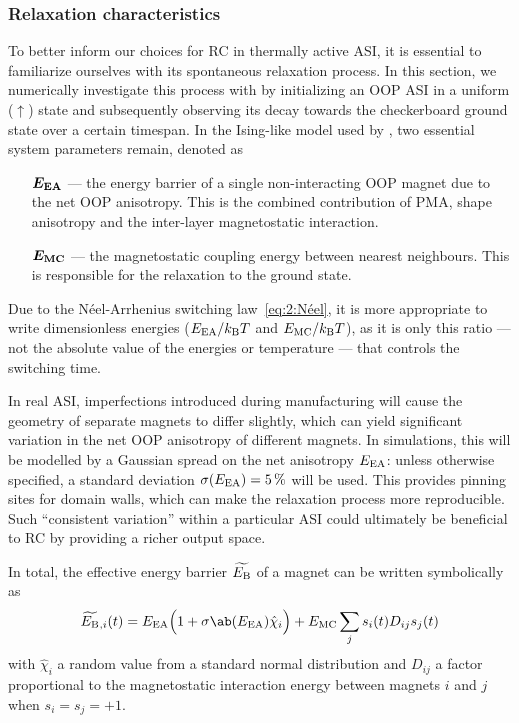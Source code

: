 \subsubsection{Relaxation characteristics}
To better inform our choices for RC in thermally active ASI, it is essential to familiarize ourselves with its spontaneous relaxation process.
In this section, we numerically investigate this process with \hotspice by initializing an OOP ASI in a uniform ($\uparrow$) state and subsequently observing its decay towards the checkerboard ground state over a certain timespan.
In the Ising-like model used by \hotspice, two essential system parameters remain, denoted as
\begin{itemize}[leftmargin=4.1em]
	\item[$\boldsymbol{E_\mathrm{EA}}$ ---] the energy barrier of a single non-interacting OOP magnet due to the net OOP anisotropy.
	This is the combined contribution of PMA, shape anisotropy and the inter-layer magnetostatic interaction.
	\item[$\boldsymbol{E_\mathrm{MC}}$ ---] the magnetostatic coupling energy between nearest neighbours.
	This is responsible for the relaxation to the ground state.
\end{itemize}
Due to the N\'eel-Arrhenius switching law~\eqref{eq:2:Néel}, it is more appropriate to write dimensionless energies ($\EEA/\kBT$ and $\EMC/\kBT$), as it is only this ratio --- not the absolute value of the energies or temperature --- that controls the switching time. \par
In real ASI, imperfections introduced during manufacturing will cause the geometry of separate magnets to differ slightly, which can yield significant variation in the net OOP anisotropy of different magnets.
In simulations, this will be modelled by a Gaussian spread on the net anisotropy $E_\mathrm{EA}$: unless otherwise specified, a standard deviation $\sigma(E_\mathrm{EA}) = \SI{5}{\percent}$ will be used.
This provides pinning sites for domain walls, which can make the relaxation process more reproducible.
Such ``consistent variation'' within a particular ASI could ultimately be beneficial to RC by providing a richer output space. \par
In total, the effective energy barrier $\widetilde{E_\mathrm{B}}$ of a magnet can be written symbolically as
\begin{equation}
	\label{eq:3:OOP_relaxation_EBeff}
	\EBeff{}_{,i}(t) = \EEA \Big(1 + \sigma\ab(\EEA) \hat{\chi}_i \Big) + \EMC \sum_j s_i(t) D_{ij} s_j(t) 
\end{equation}
with $\hat{\chi}_i$ a random value from a standard normal distribution and $D_{ij}$ a factor proportional to the magnetostatic interaction energy between magnets $i$ and $j$ when $s_i=s_j=+1$. \\\par

